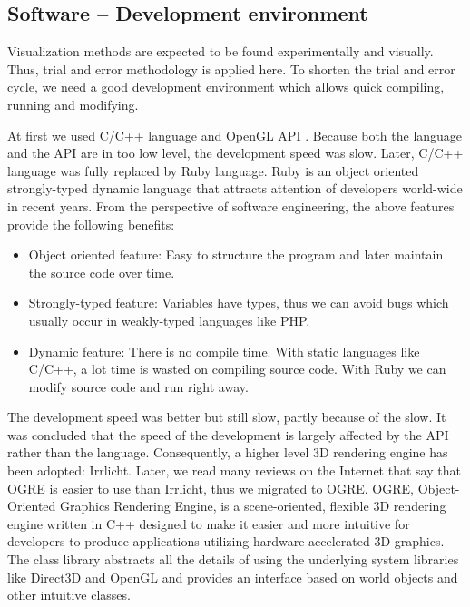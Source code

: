 \subsection{Software -- Development environment}

Visualization methods are expected to be found experimentally and visually. Thus, trial and error methodology is applied here. To shorten the trial and error cycle, we need a good development environment which allows quick compiling, running and modifying.

At first we used C/C++ language and OpenGL API \citep{Reference10}. Because both the language and the API are in too low level, the development speed was slow. Later, C/C++ language was fully replaced by Ruby language. Ruby is an object oriented strongly-typed dynamic language that attracts attention of developers world-wide in recent years. From the perspective of software engineering, the above features provide the following benefits:

\begin{itemize}
	\item Object oriented feature: Easy to structure the program and later maintain the source code over time.
	\item Strongly-typed feature: Variables have types, thus we can avoid bugs which usually occur in weakly-typed languages like PHP.
	\item Dynamic feature: There is no compile time. With static languages like C/C++, a lot time is wasted on compiling source code. With Ruby we can modify source code and run right away.
\end{itemize}

The development speed was better but still slow, partly because of the slow. It was concluded that the speed of the development is largely affected by the API rather than the language. Consequently, a higher level 3D rendering engine has been adopted: Irrlicht. Later, we read many reviews on the Internet that say that OGRE \citep{Reference11} is easier to use than Irrlicht, thus we migrated to OGRE. OGRE, Object-Oriented Graphics Rendering Engine, is a scene-oriented, flexible 3D rendering engine written in C++ designed to make it easier and more intuitive for developers to produce applications utilizing hardware-accelerated 3D graphics. The class library abstracts all the details of using the underlying system libraries like Direct3D and OpenGL and provides an interface based on world objects and other intuitive classes.

